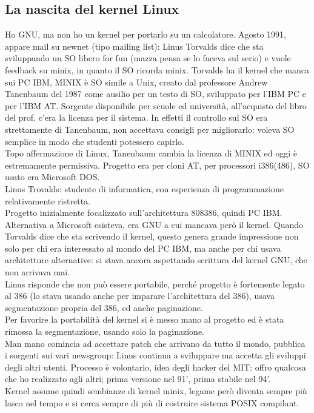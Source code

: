 \documentclass{article}
\begin{document}
\subsection{La nascita del kernel Linux}
Ho GNU, ma non ho un kernel per portarlo su un calcolatore. Agosto 1991, appare mail su newnet (tipo mailing list): Linus Torvalds dice che sta sviluppando un SO libero for fun (mazza pensa se lo faceva sul serio) e vuole feedback su minix, in quanto il SO ricorda minix. Torvalds ha il kernel che manca sui PC IBM, MINIX è SO simile a Unix, creato dal professore Andrew Tanenbaum del 1987 come ausilio per un testo di SO, sviluppato per l'IBM PC e per l'IBM AT. Sorgente disponibile per scuole ed università, all'acquisto del libro del prof. c'era la licenza per il sistema. In effetti il controllo sul SO era strettamente di Tanenbaum, non accettava consigli per migliorarlo: voleva SO semplice in modo che studenti potessero capirlo.\\ Topo affermazione di Linux, Tanenbaum cambia la licenza di MINIX ed oggi è estremamente permissiva. Progetto era per cloni AT, per processori i386(486), SO usato era Microsoft DOS.\\ Linus Trovalds: studente di informatica, con esperienza di programmazione relativamente ristretta.\\ Progetto inizialmente focalizzato sull'architettura 808386, quindi PC IBM. Alternativa a Microsoft esisteva, era GNU a cui mancava però il kernel. Quando Torvalds dice che sta scrivendo il kernel, questo genera grande impressione non solo per chi era interessato al mondo del PC IBM, ma anche per chi usava architetture alternative: si stava ancora aspettando scrittura del kernel GNU, che non arrivava mai.\\ Linus risponde che non può essere portabile, perché progetto è fortemente legato al 386 (lo stava usando anche per imparare l'architettura del 386), usava segmentazione propria del 386, ed anche paginazione.\\ Per favorire la portabilità del kernel si è messo mano al progetto ed è stata rimossa la segmentazione, usando solo la paginazione.\\ Man mano comincia ad accettare patch che arrivano da tutto il mondo, pubblica i sorgenti sui vari newsgroup: Linus continua a sviluppare ma accetta gli sviluppi degli altri utenti. Processo è volontario, idea degli hacker del MIT: offro qualcosa che ho realizzato agli altri; prima versione nel 91', prima stabile nel 94'.\\ Kernel assume quindi sembianze di kernel minix, legame però diventa sempre più lasco nel tempo e si cerca sempre di più di costruire sistema POSIX compilant.
\end{document}
